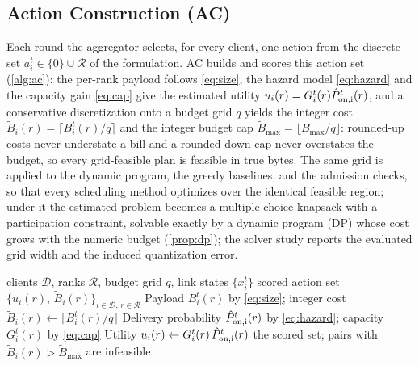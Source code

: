 \documentclass[a4paper,fleqn]{cas-dc}
\begin{document}
\subsection{Action Construction (AC)}
\label{sec:ac}
Each round the aggregator selects, for every client, one action from the discrete set $a_i^t\in\{0\}\cup\mathcal R$ of the formulation. AC builds and scores this action set (\cref{alg:ac}): the per-rank payload follows \cref{eq:size}, the hazard model \cref{eq:hazard} and the capacity gain \cref{eq:cap} give the estimated utility $u_i(r)=G_i^t(r)\hat P_{\rm on,i}^t(r)$, and a conservative discretization onto a budget grid $q$ yields the integer cost $\widetilde B_i(r)=\lceil B_i^t(r)/q\rceil$ and the integer budget cap $\widetilde B_{\max}=\lfloor B_{\max}/q\rfloor$: rounded-up costs never understate a bill and a rounded-down cap never overstates the budget, so every grid-feasible plan is feasible in true bytes. The same grid is applied to the dynamic program, the greedy baselines, and the admission checks, so that every scheduling method optimizes over the identical feasible region; under it the estimated problem becomes a multiple-choice knapsack with a participation constraint, solvable exactly by a dynamic program (DP) whose cost grows with the numeric budget (\cref{prop:dp}); the solver study reports the evaluated grid width and the induced quantization error.
\par
\begin{algorithm}[tbp]
\caption{Action Construction (AC)}
\label{alg:ac}
\begin{algorithmic}[1]
\Require clients $\mathcal D$, ranks $\mathcal R$, budget grid $q$, link states $\{x_i^t\}$
\Ensure scored action set $\{u_i(r),\,\widetilde B_i(r)\}_{i\in\mathcal D,\,r\in\mathcal R}$
\State Payload $B_i^t(r)$ by \cref{eq:size}; integer cost $\widetilde B_i(r)\gets\lceil B_i^t(r)/q\rceil$
\State Delivery probability $\hat P_{\rm on,i}^t(r)$ by \cref{eq:hazard}; capacity $G_i^t(r)$ by \cref{eq:cap}
\State Utility $u_i(r)\gets G_i^t(r)\,\hat P_{\rm on,i}^t(r)$
\EndFor
\State \Return the scored set; pairs with $\widetilde B_i(r)>\widetilde B_{\max}$ are infeasible
\end{algorithmic}
\end{algorithm}
\par
\end{document}
